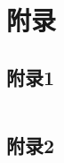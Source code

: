 
\section*{附录}

\subsection*{附录1}\label{sec:app1}

\inputminted{python}{code/simplify-halley.py}

\subsection*{附录2}\label{sec:app2}

\inputminted{python}{code/simplify-div.py}
